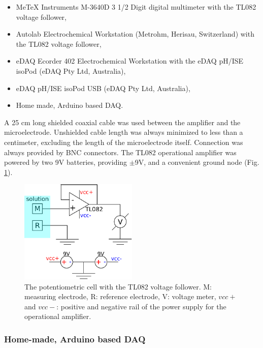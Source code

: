 \begin{itemize}
\item MeTeX Instruments M-3640D 3 1/2 Digit digital multimeter with the TL082 voltage follower,
\item Autolab Electrochemical Workstation (Metrohm, Herisau, Switzerland) with the TL082 voltage follower,
\item eDAQ Ecorder 402 Electrochemical Workstation with the eDAQ pH/ISE isoPod (eDAQ Pty Ltd, Australia),
\item eDAQ pH/ISE isoPod USB (eDAQ Pty Ltd, Australia),
\item Home made, Arduino based DAQ.
\end{itemize}

A 25 cm long shielded coaxial cable was used between the amplifier and the microelectrode.
Unshielded cable length was always minimized to less than a centimeter, excluding the length of the microelectrode itself.
Connection was always provided by BNC connectors.
The TL082 operational amplifier was powered by two 9V batteries, providing $\pm$9V, and a convenient ground node (Fig. \ref{fig:tl082}).

\begin{figure}
\centering
\includegraphics[width=0.5\textwidth]{img/circuit.eps}
\caption[The potentiometric cell with the TL082 voltage follower.]{The potentiometric cell with the TL082 voltage follower.
M: measuring electrode, R: reference electrode, V: voltage meter, $vcc+$ and $vcc-$: positive and negative rail of the power supply for the operational amplifier.} 
\label{fig:tl082}
\end{figure}

\subsubsection{Home-made, Arduino based DAQ}


